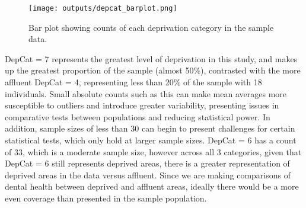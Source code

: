 \documentclass[11pt]{article}
\begin{document}
\begin{figure}
  \centering
  \texttt{[image: outputs/depcat\_barplot.png]}
  \caption{Bar plot showing counts of each deprivation category in the sample data.}
  \label{fig:depcat-barplot}
\end{figure}
\FloatBarrier  %

DepCat = 7 represents the greatest level of deprivation in this study, and makes up the greatest proportion of the sample (almost 50\%), contrasted with the more affluent DepCat = 4, representing less than 20\% of the sample with 18 individuals. Small absolute counts such as this can make mean averages more susceptible to outliers and introduce greater variability, presenting issues in comparative tests between populations and reducing statistical power. In addition, sample sizes of less than 30 can begin to present challenges for certain statistical tests, which only hold at larger sample sizes. DepCat = 6 has a count of 33, which is a moderate sample size, however across all 3 categories, given that DepCat = 6 still represents deprived areas, there is a greater representation of deprived areas in the data versus affluent. Since we are making comparisons of dental health between deprived and affluent areas, ideally there would be a more even coverage than presented in the sample population.

\end{document}
